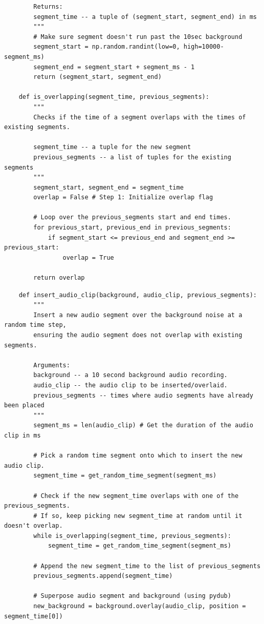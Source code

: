 \documentclass[11pt, a4paper]{article}
\begin{document}
\begin{spacing}{1.1}
\begin{lstlisting}
		Returns:
		segment_time -- a tuple of (segment_start, segment_end) in ms
		"""
		# Make sure segment doesn't run past the 10sec background
		segment_start = np.random.randint(low=0, high=10000-segment_ms) 
		segment_end = segment_start + segment_ms - 1
		return (segment_start, segment_end)
	
	def is_overlapping(segment_time, previous_segments):
		"""
		Checks if the time of a segment overlaps with the times of existing segments.
		
		segment_time -- a tuple for the new segment
		previous_segments -- a list of tuples for the existing segments
		"""
		segment_start, segment_end = segment_time
		overlap = False # Step 1: Initialize overlap flag
		
		# Loop over the previous_segments start and end times.
		for previous_start, previous_end in previous_segments:
			if segment_start <= previous_end and segment_end >= previous_start:
				overlap = True
				
		return overlap	\end{lstlisting} \newpage

	\begin{lstlisting}
	def insert_audio_clip(background, audio_clip, previous_segments):
		"""
		Insert a new audio segment over the background noise at a random time step, 
		ensuring the audio segment does not overlap with existing segments.
		
		Arguments:
		background -- a 10 second background audio recording.  
		audio_clip -- the audio clip to be inserted/overlaid. 
		previous_segments -- times where audio segments have already been placed
		"""
		segment_ms = len(audio_clip) # Get the duration of the audio clip in ms
		
		# Pick a random time segment onto which to insert the new audio clip.
		segment_time = get_random_time_segment(segment_ms)
		
		# Check if the new segment_time overlaps with one of the previous_segments. 
		# If so, keep picking new segment_time at random until it doesn't overlap.
		while is_overlapping(segment_time, previous_segments):
			segment_time = get_random_time_segment(segment_ms)
		
		# Append the new segment_time to the list of previous_segments
		previous_segments.append(segment_time)
		
		# Superpose audio segment and background (using pydub)
		new_background = background.overlay(audio_clip, position = segment_time[0])
		

\end{lstlisting}
\end{spacing}
\end{document}
